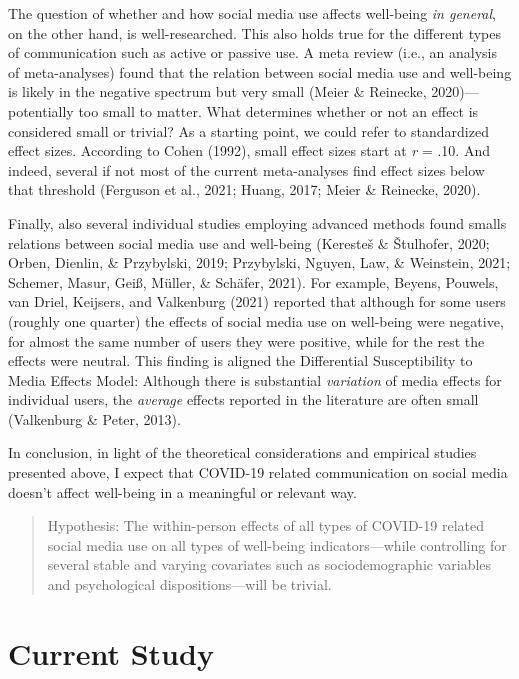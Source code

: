 \documentclass[
  man,mask]{apa6}
\begin{document}
The question of whether and how social media use affects well-being \emph{in general}, on the other hand, is well-researched.
This also holds true for the different types of communication such as active or passive use.
A meta review (i.e., an analysis of meta-analyses) found that the relation between social media use and well-being is likely in the negative spectrum but very small (Meier \& Reinecke, 2020)---potentially too small to matter.
What determines whether or not an effect is considered small or trivial?
As a starting point, we could refer to standardized effect sizes.
According to Cohen (1992), small effect sizes start at \emph{r} = .10.
And indeed, several if not most of the current meta-analyses find effect sizes below that threshold (Ferguson et al., 2021; Huang, 2017; Meier \& Reinecke, 2020).

Finally, also several individual studies employing advanced methods found smalls relations between social media use and well-being (Keresteš \& Štulhofer, 2020; Orben, Dienlin, \& Przybylski, 2019; Przybylski, Nguyen, Law, \& Weinstein, 2021; Schemer, Masur, Geiß, Müller, \& Schäfer, 2021).
For example, Beyens, Pouwels, van Driel, Keijsers, and Valkenburg (2021) reported that although for some users (roughly one quarter) the effects of social media use on well-being were negative, for almost the same number of users they were positive, while for the rest the effects were neutral.
This finding is aligned the Differential Susceptibility to Media Effects Model:
Although there is substantial \emph{variation} of media effects for individual users, the \emph{average} effects reported in the literature are often small (Valkenburg \& Peter, 2013).

In conclusion, in light of the theoretical considerations and empirical studies presented above, I expect that COVID-19 related communication on social media doesn't affect well-being in a meaningful or relevant way.

\begin{quote}
Hypothesis: The within-person effects of all types of COVID-19 related social media use on all types of well-being indicators---while controlling for several stable and varying covariates such as sociodemographic variables and psychological dispositions---will be trivial.
\end{quote}

\hypertarget{current-study}{%
\section{Current Study}\label{current-study}}
\end{document}
